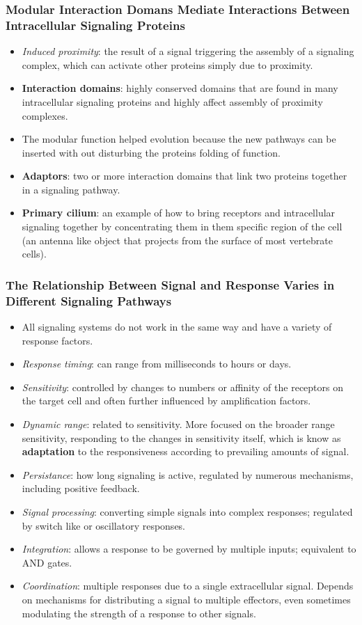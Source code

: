 \documentclass[12pt,a4paper]{article}
\begin{document}
\subsubsection{Modular Interaction Domans Mediate Interactions Between Intracellular Signaling Proteins}
\begin{itemize}
    \item \textit{Induced proximity}: the result of a signal triggering the assembly of a signaling complex, which can activate other proteins simply due to proximity.
    \item \textbf{Interaction domains}: highly conserved domains that are found in many intracellular signaling proteins and highly affect assembly of proximity complexes.
    \item The modular function helped evolution because the new pathways can be inserted with out disturbing the proteins folding of function.
    \item \textbf{Adaptors}: two or more interaction domains that link two proteins together in a signaling pathway.
    \item \textbf{Primary cilium}: an example of how to bring receptors and intracellular signaling together by concentrating them in them specific region of the cell (an antenna like object that projects from the surface of most vertebrate cells).
\end{itemize}

\subsubsection{The Relationship Between Signal and Response Varies in Different Signaling Pathways}
\begin{itemize}
    \item All signaling systems do not work in the same way and have a variety of response factors.    
    \item \textit{Response timing}: can range from milliseconds to hours or days.
    \item \textit{Sensitivity}: controlled by changes to numbers or affinity of the receptors on the target cell and often further influenced by amplification factors.
    \item \textit{Dynamic range}: related to sensitivity. More focused on the broader range sensitivity, responding to the changes in sensitivity itself, which is know as \textbf{adaptation} to the responsiveness according to prevailing amounts of signal.
    \item \textit{Persistance}: how long signaling is active, regulated by numerous mechanisms, including positive feedback.
    \item \textit{Signal processing}: converting simple signals into complex responses; regulated by switch like or oscillatory responses.
    \item \textit{Integration}: allows a response to be governed by multiple inputs; equivalent to AND gates.
    \item \textit{Coordination}: multiple responses due to a single extracellular signal. Depends on mechanisms for distributing a signal to multiple effectors, even sometimes modulating the strength of a response to other signals.
\end{itemize}
\end{document}
